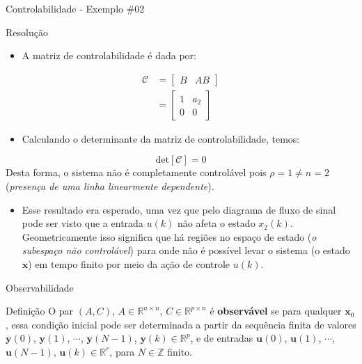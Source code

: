 \begin{frame}{Controlabilidade - Exemplo \#02}
\begin{block}{Resolução}
\begin{itemize}
    \item A matriz de controlabilidade é dada por:
\end{itemize}
\begin{align*}
    \mathcal{C} &= \begin{bmatrix} B & AB \end{bmatrix} \\
    &= \begin{bmatrix} 1 & a_2 \\ 0 & 0 \end{bmatrix}
\end{align*}
\vspace{-0.3cm}
\begin{itemize}
    \item Calculando o determinante da matriz de controlabilidade, temos:
\end{itemize}
$$\text{det}[\mathcal{C}] = 0 $$
Desta forma, o sistema não é completamente controlável pois $\rho = 1 \neq n = 2$ (\textit{presença de uma linha linearmente dependente}).
\begin{itemize}
    \item Esse resultado era esperado, uma vez que pelo diagrama de fluxo de sinal pode ser visto que a entrada $u(k)$ não afeta o  estado $x_2(k)$. Geometricamente isso significa que há regiões no espaço de estado (\textit{o subespaço não controlável}) para onde não é possível levar o sistema (o estado $\bm{x}$) em tempo finito por meio da ação de controle $u(k)$.
\end{itemize}
\end{block}
\end{frame}

\begin{frame}{Observabilidade}
\begin{block}{Definição}
O par $(A,C)$, $A \in \mathbb{R}^{n \times n}$, $C \in \mathbb{R}^{p \times n}$ é \textbf{observável} se para qualquer $\bm{x}_0$, essa condição inicial pode ser determinada a partir da sequência finita de valores $\bm{y}(0)$, $\bm{y}(1)$, $\cdots$, $\bm{y}(N-1)$, $\bm{y}(k) \in \mathbb{R}^{p}$, e de entradas $\bm{u}(0)$, $\bm{u}(1)$, $\cdots$, $\bm{u}(N-1)$, $\bm{u}(k) \in \mathbb{R}^{r}$, para $N \in \mathbb{Z}$ finito.
\end{block}
\end{frame}

